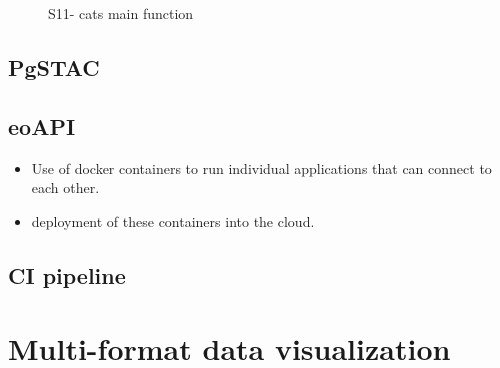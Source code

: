 \documentclass[
  oneside,
  open=any]{scrbook}
\providecommand{\tightlist}{%
  \setlength{\itemsep}{0pt}\setlength{\parskip}{0pt}}\usepackage{longtable,booktabs,array}
\begin{document}
\begin{figure}[H]


\caption{\label{fig-s11-cats}S11- cats main function}

\end{figure}%

\subsection{PgSTAC}\label{pgstac}

\subsection{eoAPI}\label{eoapi}

\begin{itemize}
\tightlist
\item
  Use of docker containers to run individual applications that can
  connect to each other.
\item
  deployment of these containers into the cloud.
\end{itemize}

\subsection{CI pipeline}\label{ci-pipeline}

\section{Multi-format data
visualization}\label{multi-format-data-visualization}
\end{document}
